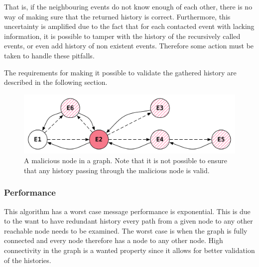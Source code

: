 	\newpar That is, if the neighbouring events do not know enough of each other, there is no way of making sure that the returned history is correct. Furthermore, this uncertainty is amplified due to the fact that for each contacted event with lacking information, it is possible to tamper with the history of the recursively called events, or even add history of non existent events. Therefore some action must be taken to handle these pitfalls.
	
	The requirements for making it possible to validate the gathered history are described in the following section. 
	
	\begin{figure}[H]
		\centering
		\includegraphics[width=\textwidth]{4connect/images/recursive-evil-node.pdf}
		\caption{A malicious node in a graph. Note that it is not possible to ensure that any history passing through the malicious node is valid.}
		\label{fig:connecting:recursive-evil-node}
	\end{figure}
	
	\subsubsection{Performance}
	This algorithm has a worst case message performance is exponential.  This is due to the want to have redundant history every path from a given node to any other reachable node needs to be examined. The worst case is when the graph is fully connected and every node therefore has a node to any other node. High connectivity in the graph is a wanted property since it allows for better validation of the histories. 
	
